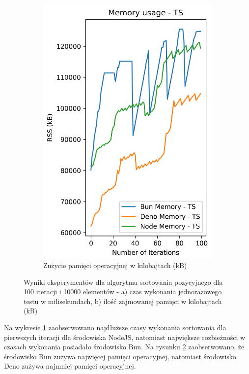 \begin{figure}[H]
\begin{subfigure}[b]{0.42\textwidth}
    \label{fig:radix_sorting_e3_ts_time}
  \end{subfigure}
  \begin{subfigure}[b]{0.42\textwidth}
    \centering
    \includegraphics[width=\textwidth]{Figures/sorting/sorting_radix_100_10000_ts_memory.png}
    \caption{Zużycie pamięci operacyjnej w kilobajtach (kB)}
    \label{fig:radix_sorting_e3_ts_memory}
  \end{subfigure}
  \hfill
  \caption{Wyniki eksperymentów dla algorytmu sortowania pozycyjnego dla 100 iteracji i 10000 elementów - a) czas wykonania jednorazowego testu w milisekundach, b) ilość zajmowanej pamięci w kilobajtach (kB)}
  \label{fig:radix_sorting_e3_ts}
\end{figure}

Na wykresie \ref{fig:radix_sorting_e3_ts_time} zaobserwowano najdłuższe czasy wykonania sortowania dla pierwszych iteracji dla środowiska NodeJS, natomiast największe rozbieżności w czasach wykonania posiadało środowisko Bun. Na rysunku \ref{fig:radix_sorting_e3_ts_memory} zaobserwowano, że środowisko Bun zużywa najwięcej pamięci operacyjnej, natomiast środowisko Deno zużywa najmniej pamięci operacyjnej.

